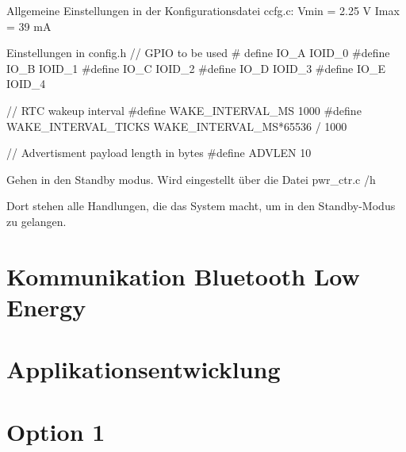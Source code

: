 Allgemeine Einstellungen in der Konfigurationsdatei ccfg.c:
Vmin = 2.25 V
Imax = 39 mA


Einstellungen in config.h
// GPIO to be used
\# define IO\_A  IOID\_0
\#define IO\_B  IOID\_1
\#define IO\_C  IOID\_2
\#define IO\_D  IOID\_3
\#define IO\_E  IOID\_4


// RTC wakeup interval
\#define WAKE\_INTERVAL\_MS 		1000
\#define WAKE\_INTERVAL\_TICKS 	WAKE\_INTERVAL\_MS*65536 / 1000


// Advertisment payload length in bytes
\#define ADVLEN 10


Gehen in den Standby modus. Wird eingestellt über die Datei pwr\_ctr.c /h

Dort stehen alle Handlungen, die das System macht, um in den Standby-Modus zu gelangen.

\section{Kommunikation Bluetooth Low Energy}





\section{Applikationsentwicklung}

\section{Option 1}






